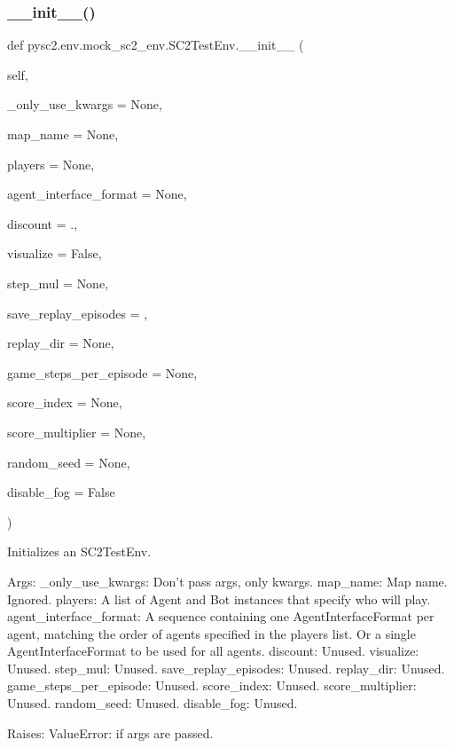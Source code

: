 \subsubsection{\texorpdfstring{\+\_\+\+\_\+init\+\_\+\+\_\+()}{\_\_init\_\_()}}
{\footnotesize\ttfamily def pysc2.\+env.\+mock\+\_\+sc2\+\_\+env.\+S\+C2\+Test\+Env.\+\_\+\+\_\+init\+\_\+\+\_\+ (\begin{DoxyParamCaption}\item[{}]{self,  }\item[{}]{\+\_\+only\+\_\+use\+\_\+kwargs = {\ttfamily None},  }\item[{}]{map\+\_\+name = {\ttfamily None},  }\item[{}]{players = {\ttfamily None},  }\item[{}]{agent\+\_\+interface\+\_\+format = {\ttfamily None},  }\item[{}]{discount = {.},  }\item[{}]{visualize = {\ttfamily False},  }\item[{}]{step\+\_\+mul = {\ttfamily None},  }\item[{}]{save\+\_\+replay\+\_\+episodes = {},  }\item[{}]{replay\+\_\+dir = {\ttfamily None},  }\item[{}]{game\+\_\+steps\+\_\+per\+\_\+episode = {\ttfamily None},  }\item[{}]{score\+\_\+index = {\ttfamily None},  }\item[{}]{score\+\_\+multiplier = {\ttfamily None},  }\item[{}]{random\+\_\+seed = {\ttfamily None},  }\item[{}]{disable\+\_\+fog = {\ttfamily False} }\end{DoxyParamCaption})}

\begin{DoxyVerb}Initializes an SC2TestEnv.

Args:
  _only_use_kwargs: Don't pass args, only kwargs.
  map_name: Map name. Ignored.
  players: A list of Agent and Bot instances that specify who will play.
  agent_interface_format: A sequence containing one AgentInterfaceFormat
per agent, matching the order of agents specified in the players list.
Or a single AgentInterfaceFormat to be used for all agents.
  discount: Unused.
  visualize: Unused.
  step_mul: Unused.
  save_replay_episodes: Unused.
  replay_dir: Unused.
  game_steps_per_episode: Unused.
  score_index: Unused.
  score_multiplier: Unused.
  random_seed: Unused.
  disable_fog: Unused.

Raises:
  ValueError: if args are passed.
\end{DoxyVerb}
 

